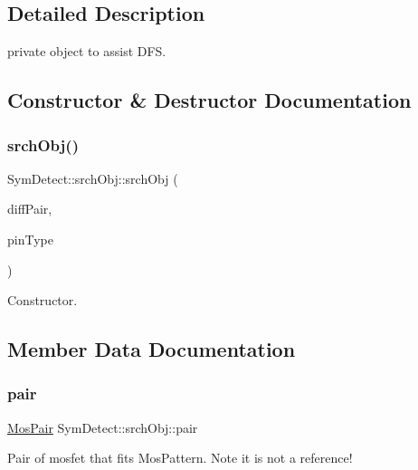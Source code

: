 \subsection{Detailed Description}
private object to assist D\+FS. 

\subsection{Constructor \& Destructor Documentation}
\mbox{\label{structSymDetect_1_1srchObj_a12d3ae03e9163b5e7bc46a224022880e}} 
\subsubsection{\texorpdfstring{srch\+Obj()}{srchObj()}}
{\footnotesize\ttfamily Sym\+Detect\+::srch\+Obj\+::srch\+Obj (\begin{DoxyParamCaption}\item[{\hyperlink{structMosPair}{Mos\+Pair} \&}]{diff\+Pair,  }\item[{\hyperlink{type_8h_afaab50027002ecbb6c8ac27e727d1bb4}{Pin\+Type}}]{pin\+Type }\end{DoxyParamCaption})\hspace{0.3cm}{\ttfamily [inline]}}



Constructor. 



\subsection{Member Data Documentation}
\mbox{\label{structSymDetect_1_1srchObj_aec9a5afaae2c8dfdf79ff4c654c73ede}} 
\subsubsection{\texorpdfstring{pair}{pair}}
{\footnotesize\ttfamily \hyperlink{structMosPair}{Mos\+Pair} Sym\+Detect\+::srch\+Obj\+::pair}

Pair of mosfet that fits Mos\+Pattern. Note it is not a reference! \mbox{\label{structSymDetect_1_1srchObj_ae7cd64a55ef6fa4dae853e0ff822888a}} 
